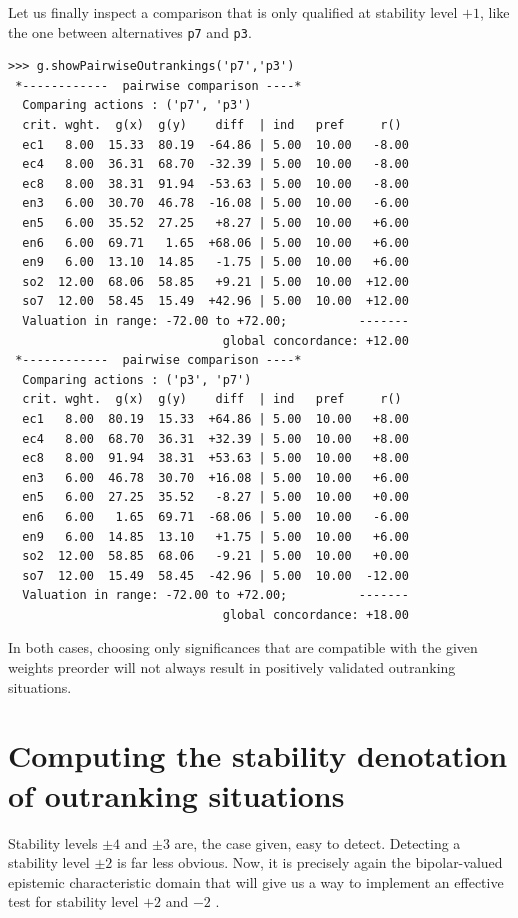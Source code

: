 Let us finally inspect a comparison that is only qualified at stability level $+1$, like the one between alternatives \texttt{p7} and \texttt{p3}.
\begin{lstlisting}[caption={Comparison of alternatives \texttt{p7} and \texttt{p3}},label=list:19.6]
>>> g.showPairwiseOutrankings('p7','p3')
 *------------  pairwise comparison ----*
  Comparing actions : ('p7', 'p3')
  crit. wght.  g(x)  g(y)    diff  | ind   pref     r()
  ec1   8.00  15.33  80.19  -64.86 | 5.00  10.00   -8.00
  ec4   8.00  36.31  68.70  -32.39 | 5.00  10.00   -8.00
  ec8   8.00  38.31  91.94  -53.63 | 5.00  10.00   -8.00
  en3   6.00  30.70  46.78  -16.08 | 5.00  10.00   -6.00
  en5   6.00  35.52  27.25   +8.27 | 5.00  10.00   +6.00
  en6   6.00  69.71   1.65  +68.06 | 5.00  10.00   +6.00
  en9   6.00  13.10  14.85   -1.75 | 5.00  10.00   +6.00
  so2  12.00  68.06  58.85   +9.21 | 5.00  10.00  +12.00
  so7  12.00  58.45  15.49  +42.96 | 5.00  10.00  +12.00
  Valuation in range: -72.00 to +72.00;          -------
                              global concordance: +12.00
 *------------  pairwise comparison ----*
  Comparing actions : ('p3', 'p7')
  crit. wght.  g(x)  g(y)    diff  | ind   pref     r()
  ec1   8.00  80.19  15.33  +64.86 | 5.00  10.00   +8.00
  ec4   8.00  68.70  36.31  +32.39 | 5.00  10.00   +8.00
  ec8   8.00  91.94  38.31  +53.63 | 5.00  10.00   +8.00
  en3   6.00  46.78  30.70  +16.08 | 5.00  10.00   +6.00
  en5   6.00  27.25  35.52   -8.27 | 5.00  10.00   +0.00
  en6   6.00   1.65  69.71  -68.06 | 5.00  10.00   -6.00
  en9   6.00  14.85  13.10   +1.75 | 5.00  10.00   +6.00
  so2  12.00  58.85  68.06   -9.21 | 5.00  10.00   +0.00
  so7  12.00  15.49  58.45  -42.96 | 5.00  10.00  -12.00
  Valuation in range: -72.00 to +72.00;          -------
                              global concordance: +18.00
\end{lstlisting}
In both cases, choosing only significances that are compatible with the given weights preorder will not always result in positively validated outranking situations.

\section{Computing the stability denotation of outranking situations}
\label{sec:19.3}

Stability levels $\pm 4$ and $\pm 3$ are, the case given, easy to detect. Detecting a stability level $\pm 2$ is far less obvious.  Now, it is precisely again the bipolar-valued epistemic characteristic domain that will give us a way to implement an effective test for stability level $+2$ and $-2$ \citep{BIS-2004b,BIS-2004c}. 

